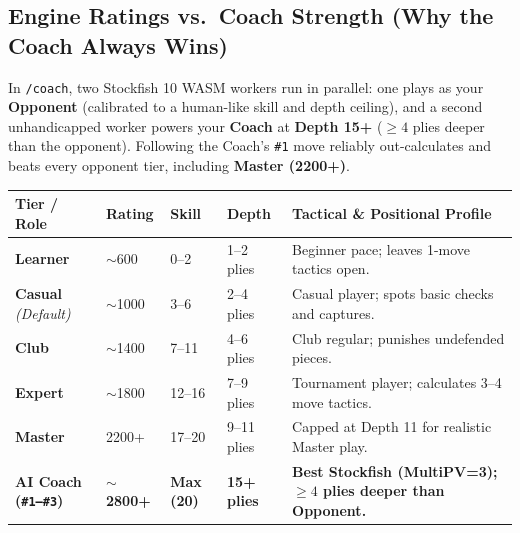 \documentclass[10pt,twoside]{article}
\begin{document}
\subsection*{\sffamily\small\textcolor{brand}{Engine Ratings vs.\ Coach Strength (Why the Coach Always Wins)}}
\scriptsize
In \texttt{/coach}, two Stockfish 10 WASM workers run in parallel: one plays as your \textbf{Opponent} (calibrated to a human-like skill and depth ceiling), and a second unhandicapped worker powers your \textbf{Coach} at \textbf{Depth 15+} ($\ge 4$ plies deeper than the opponent). Following the Coach's \texttt{\#1} move reliably out-calculates and beats every opponent tier, including \textbf{Master (2200+)}.

\vspace{1pt}
\begin{tabularx}{\textwidth}{@{}llllX@{}}
\toprule
\textbf{\sffamily Tier / Role} & \textbf{\sffamily Rating} & \textbf{\sffamily Skill} & \textbf{\sffamily Depth} & \textbf{\sffamily Tactical \& Positional Profile} \\
\midrule
\textbf{Learner} & $\sim$600 & 0--2 & 1--2 plies & Beginner pace; leaves 1-move tactics open. \\
\textbf{Casual} \emph{(Default)} & $\sim$1000 & 3--6 & 2--4 plies & Casual player; spots basic checks and captures. \\
\textbf{Club} & $\sim$1400 & 7--11 & 4--6 plies & Club regular; punishes undefended pieces. \\
\textbf{Expert} & $\sim$1800 & 12--16 & 7--9 plies & Tournament player; calculates 3--4 move tactics. \\
\textbf{Master} & 2200+ & 17--20 & 9--11 plies & Capped at Depth 11 for realistic Master play. \\
\rowcolor{brandlight!55!white}
\textbf{AI Coach (\texttt{\#1--\#3})} & \textbf{$\sim$2800+} & \textbf{Max (20)} & \textbf{15+ plies} & \textbf{Best Stockfish (MultiPV=3); $\ge 4$ plies deeper than Opponent.} \\
\bottomrule
\end{tabularx}

\vspace{2pt}
\end{document}
